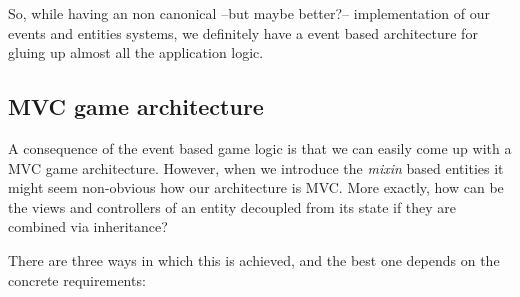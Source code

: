 \documentclass[a4paper,10pt]{article}
\begin{document}
So, while having an non canonical --but maybe better?-- implementation
of our events and entities systems, we definitely have a event based
architecture for gluing up almost all the application logic.

\subsection{MVC game architecture}

A consequence of the event based game logic is that we can easily come
up with a MVC game architecture. However, when we introduce the
\emph{mixin} based entities it might seem non-obvious how our
architecture is MVC. More exactly, how can be the views and
controllers of an entity decoupled from its state if they are combined
via inheritance?

There are three ways in which this is achieved, and the best one
depends on the concrete requirements:
\end{document}
